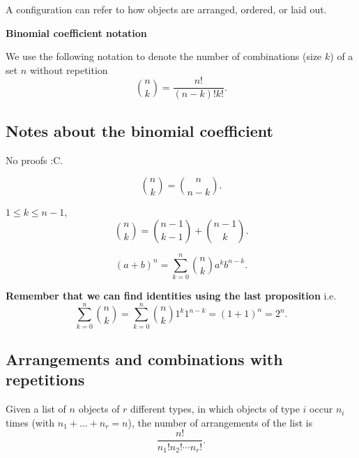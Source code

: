 \documentclass[10pt, a4paper]{article}
\begin{document}
\begin{definition}[Configuration]
    A configuration can refer to how objects are arranged,
    ordered,
    or laid out.
\end{definition}

\textbf{Binomial coefficient notation}

We use the following notation to denote the number of combinations
(size $k$)
of a set $n$ without repetition
\[
\binom{n}{k} = \frac{n!}{(n - k)!k!}.
\]

\subsection{Notes about the binomial coefficient}
No proofs :C.

\begin{proposition}
    \[
    \binom{n}{k} = \binom{n}{n - k}.
    \]
\end{proposition}

\begin{proposition}
    $1 \leq k \leq n - 1$,
    \[
    \binom{n}{k} = \binom{n - 1}{k - 1} + \binom{n - 1}{k}.
    \]
\end{proposition}

\begin{proposition}
    \[
    (a + b) ^ n = \sum_{k = 0}^{n}\binom{n}{k}a ^ kb ^ {n - k}.
    \]
\end{proposition}

\textbf{Remember that we can find identities using the last proposition}
i.e.
\[
\sum_{k = 0}^{n}\binom{n}{k} = \sum_{k = 0}^{n}\binom{n}{k}1 ^ k1 ^ {n - k} = (1 + 1) ^ n = 2 ^ n.
\]

\subsection{Arrangements and combinations with repetitions}

\begin{theorem}
    Given a list of $n$ objects of $r$ different types,
    in which objects of type $i$ occur $n_i$ times
    (with $n_1 + \dotsc + n_r = n$),
    the number of arrangements of the list is
    \[
    \frac{n!}{n_1!n_2!\dotsi n_r!}.
    \]
\end{theorem}

\begin{center}
\end{center}
\hfill
\end{document}
